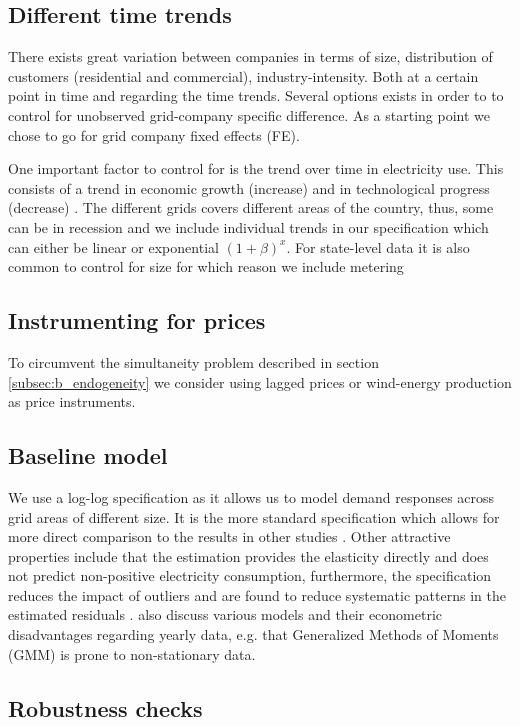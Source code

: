 \label{sec:empirical}
\subsection{Different time trends}
\label{subsec:e_trends}
There exists great variation between companies in terms of size, distribution of customers (residential and commercial), industry-intensity. Both at a certain point in time and regarding the time trends. Several options exists in order to to control for unobserved grid-company specific difference. As a starting point we chose to go for grid company fixed effects (FE).
\par
One important factor to control for is the trend over time in electricity use. This consists of a trend in economic growth (increase) and in technological progress (decrease) \citep{lijesen2007real}. The different grids covers different areas of the country, thus, some can be in recession and we include individual trends in our specification which can either be linear or exponential $(1+\beta)^x$. For state-level data it is also common to control for size \citep{burke2017price} for which reason we include metering


\subsection{Instrumenting for prices}
\label{subsec:instruments}
To circumvent the simultaneity problem described in section \ref{subsec:b_endogeneity} we consider using lagged prices or wind-energy production as price instruments.

\subsection{Baseline model}
\label{subsec:model}
We use a log-log specification as it allows us to model demand responses across grid areas of different size. It is the more standard specification which allows for more direct comparison to the results in other studies \citep{burke2017price}. Other attractive properties include that the estimation provides the elasticity directly and does not predict non-positive electricity consumption, furthermore, the specification reduces the impact of outliers and are found to reduce systematic patterns in the estimated residuals \citep{burke2017price}. \citet{burke2017price}  also discuss various models and their econometric disadvantages regarding yearly data, e.g. that Generalized Methods of Moments (GMM) is prone to non-stationary data.


\subsection{Robustness checks}
\label{subsec:robustness}
